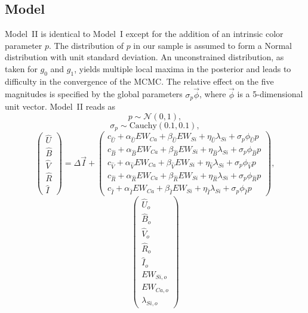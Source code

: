 \documentclass[trackchanges]{aastex61}   	%
\begin{document}
{\subsection{Model}
\label{modelIImodel:sec}
Model~II is identical to Model~I except for the 
addition of an intrinsic color parameter $p$.  The distribution of $p$ in our sample
is assumed to form a Normal distribution with unit standard deviation.  An unconstrained distribution,
as taken for $g_0$ and $g_1$, yields multiple local maxima in the posterior and leads to difficulty in the convergence of the MCMC.
The relative effect on the five magnitudes is specified by the global parameters 
$\sigma_p\vec{\phi}$, where $\vec{\phi}$ is a 5-dimensional unit vector.
Model~II reads as
\begin{equation}
p  \sim \mathcal{N}(0,1 ),
\end{equation}
\begin{equation}
\sigma_p  \sim \text{Cauchy}(0.1,0.1),
\end{equation}
\begin{equation}
\begin{pmatrix}
{\hat{U}}\\{\hat{B}}\\{\hat{V}}\\{\hat{R}}\\{\hat{I}}
\end{pmatrix}
=
\Delta  \vec{I} +
\begin{pmatrix}
c_{\hat{U}}+\alpha_{\hat{U}} EW_{Ca} + \beta_{\hat{U}} EW_{Si} + \eta_{\hat{U}} \lambda_{Si} + \sigma_p\phi_{\hat{U}} p\\
c_{\hat{B}}+\alpha_{\hat{B}} EW_{Ca} + \beta_{\hat{B}} EW_{Si} + \eta_{\hat{B}} \lambda_{Si}  + \sigma_p\phi_{\hat{B}} p\\
c_{\hat{V}}+\alpha_{\hat{V}} EW_{Ca} + \beta_{\hat{V}} EW_{Si} + \eta_{\hat{V}} \lambda_{Si} + \sigma_p\phi_{\hat{V}}  p\\
c_{\hat{R}}+\alpha_{\hat{R}} EW_{Ca} + \beta_{\hat{R}} EW_{Si} + \eta_{\hat{R}} \lambda_{Si} + \sigma_p\phi_{\hat{R}} p\\
c_{\hat{I}}+\alpha_{\hat{I}} EW_{Ca} + \beta_{\hat{I}} EW_{Si}+ \eta_{\hat{I}} \lambda_{Si}+ \sigma_p\phi_{\hat{I}}  p
\end{pmatrix},
\label{ewsiv2:eqn}
\end{equation}
\begin{equation}
\begin{pmatrix}
{\hat{U}}_o\\{\hat{B}}_o\\ {\hat{V}}_o\\{\hat{R}}_o\\{\hat{I}}_o\\EW_{Si, o}\\ EW_{Ca, o} \\ \lambda_{Si, o}

\end{pmatrix}
\end{equation}}
\end{document}
